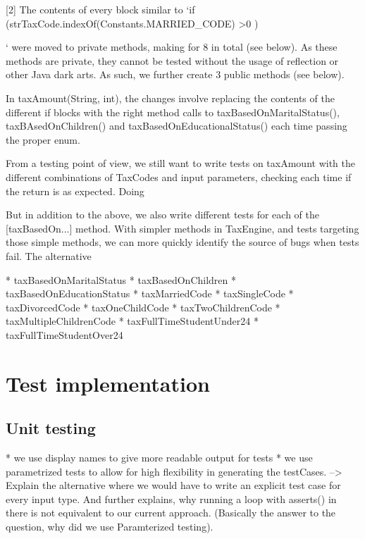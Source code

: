 \documentclass[11pt]{article}
\begin{document}
[2] The contents of every block similar to `if (strTaxCode.indexOf(Constants.MARRIED_CODE) >0 ) {` were moved to private methods, making for 8 in total (see below). As these methods are private, they cannot be tested without the usage of reflection or other Java dark arts. As such, we further create 3 public methods (see below).

In taxAmount(String, int), the changes involve replacing the contents of the different if blocks with the right method calls to taxBasedOnMaritalStatus(), taxBAsedOnChildren() and taxBasedOnEducationalStatus() each time passing the proper enum. 

From a testing point of view, we still want to write tests on taxAmount with the different combinations of TaxCodes and input parameters, checking each time if the return is as expected. Doing  

But in addition to the above, we also write different tests for each of the [taxBasedOn...] method. With simpler methods in TaxEngine, and tests targeting those simple methods, we can more quickly identify the source of bugs when tests fail. The alternative 

* taxBasedOnMaritalStatus
* taxBasedOnChildren
* taxBasedOnEducationStatus  
* taxMarriedCode
* taxSingleCode
* taxDivorcedCode
* taxOneChildCode
* taxTwoChildrenCode
* taxMultipleChildrenCode
* taxFullTimeStudentUnder24
* taxFullTimeStudentOver24

\section{Test implementation}


\subsection{Unit testing}

* we use display names to give more readable output for tests
* we use parametrized tests to allow for high flexibility in generating the testCases. --> Explain the alternative where we would have to write an explicit test case for every input type. And further explains, why running a loop with asserts() in there is not equivalent to our current approach. (Basically the answer to the question, why did we use Paramterized testing). 

}
\end{document}
